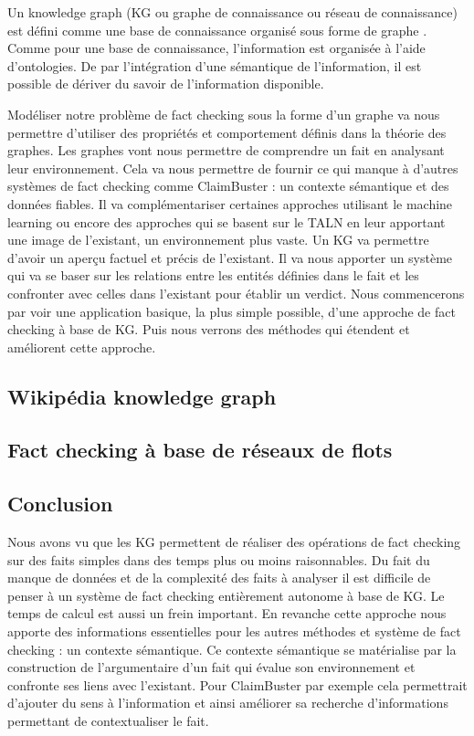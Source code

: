 Un knowledge graph (KG ou graphe de connaissance ou réseau de connaissance) est défini comme une base de connaissance organisé sous forme de graphe \cite{ehrlinger2016towards} \cite{JoStichburyKG}. Comme pour une base de connaissance, l'information est organisée à l'aide d'ontologies. De par l'intégration d'une sémantique de l'information, il est possible de dériver du savoir de l'information disponible. 

Modéliser notre problème de fact checking sous la forme d'un graphe va nous permettre d'utiliser des propriétés et comportement définis dans la théorie des graphes. Les graphes vont nous permettre de comprendre un fait en analysant leur environnement. Cela va nous permettre de fournir ce qui manque à d'autres systèmes de fact checking comme ClaimBuster : un contexte sémantique et des données fiables. Il va complémentariser certaines approches utilisant le machine learning ou encore des approches qui se basent sur le TALN en leur apportant une image de l'existant, un environnement plus vaste. Un KG va permettre d'avoir un aperçu factuel et précis de l'existant. Il va nous apporter un système qui va se baser sur les relations entre les entités définies dans le fait et les confronter avec celles dans l'existant pour établir un verdict. 
Nous commencerons par voir une application basique, la plus simple possible, d'une approche de fact checking à base de KG. Puis nous verrons des méthodes qui étendent et améliorent cette approche.

\subsection{Wikipédia knowledge graph}


\label{sec:wkg}

\subsection{Fact checking à base de réseaux de flots} 



\subsection{Conclusion}

Nous avons vu que les KG permettent de réaliser des opérations de fact checking sur des faits simples dans des temps plus ou moins raisonnables. Du fait du manque de données et de la complexité des faits à analyser il est difficile de penser à un système de fact checking entièrement autonome à base de KG. Le temps de calcul est aussi un frein important. En revanche cette approche nous apporte des informations essentielles pour les autres méthodes et système de fact checking : un contexte sémantique. Ce contexte sémantique se matérialise par la construction de l'argumentaire d'un fait qui évalue son environnement et confronte ses liens avec l'existant. Pour ClaimBuster par exemple cela permettrait d'ajouter du sens à l'information et ainsi améliorer sa recherche d'informations permettant de contextualiser le fait.

